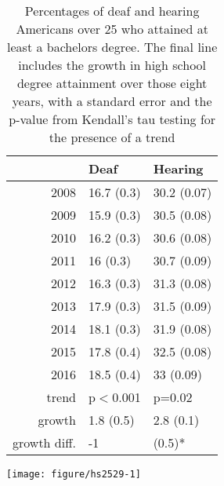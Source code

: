 \documentclass{article}\usepackage[]{graphicx}\usepackage[]{color}
\makeatletter
\def\maxwidth{ %
  \ifdim\Gin@nat@width>\linewidth
    \linewidth
  \else
    \Gin@nat@width
  \fi
}
\newenvironment{knitrout}{}{} %
\makeatother
\begin{document}
\begin{table}[ht]
\centering
\begin{tabular}{rll}
  \hline
 & Deaf & Hearing \\
  \hline
2008 & 16.7 (0.3) & 30.2 (0.07) \\
  2009 & 15.9 (0.3) & 30.5 (0.08) \\
  2010 & 16.2 (0.3) & 30.6 (0.08) \\
  2011 & 16 (0.3) & 30.7 (0.09) \\
  2012 & 16.3 (0.3) & 31.3 (0.08) \\
  2013 & 17.9 (0.3) & 31.5 (0.09) \\
  2014 & 18.1 (0.3) & 31.9 (0.08) \\
  2015 & 17.8 (0.4) & 32.5 (0.08) \\
  2016 & 18.5 (0.4) & 33 (0.09) \\
  trend & p$<$0.001 & p=0.02 \\
  growth & 1.8 (0.5) & 2.8 (0.1) \\
  growth diff. & -1 & (0.5)* \\
   \hline
\end{tabular}
\caption{Percentages of deaf and hearing Americans over 25 who attained at least a bachelors degree. The final line includes the growth in high school degree attainment over those eight years, with a standard error and the p-value from Kendall's tau testing for the presence of a trend}
\end{table}


\clearpage

\begin{center}
\begin{knitrout}
\color{fgcolor}
\texttt{[image: figure/hs2529-1]}

\end{knitrout}
\end{center}
\end{document}
